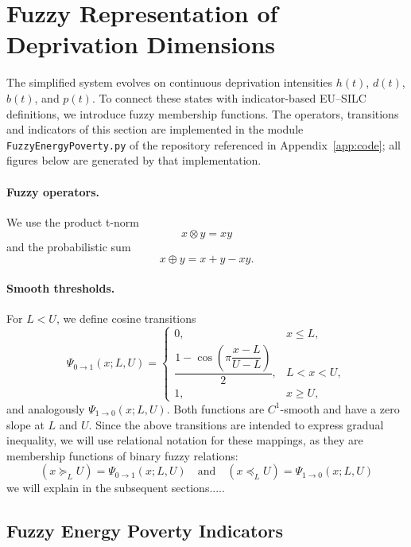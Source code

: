 \documentclass[11pt,a4paper]{article}
\begin{document}


\section{Fuzzy Representation of Deprivation Dimensions}\label{sec:fuzzy}

The simplified system evolves on continuous deprivation intensities
$h(t)$, $d(t)$, $b(t)$, and $p(t)$. To connect these states with indicator-based
EU--SILC definitions, we introduce fuzzy membership functions. The operators,
transitions and indicators of this section are implemented in the module
\texttt{FuzzyEnergyPoverty.py} of the repository referenced in
Appendix~\ref{app:code}; all figures below are generated by that
implementation.

\paragraph{Fuzzy operators.}
We use the product t-norm
\[
x\otimes y = xy
\]
and the probabilistic sum
\[
x\oplus y = x+y-xy.
\]

\paragraph{Smooth thresholds.}
For $L<U$, we define cosine transitions
\begin{equation}\label{eq:costransition}
\Psi_{0\to1}(x;L,U)=
\begin{cases}
0,&x\le L,\\
\dfrac{1-\cos\!\left(\pi\dfrac{x-L}{U-L}\right)}{2},&L<x<U,\\
1,&x\ge U,
\end{cases}
\end{equation}
and analogously $\Psi_{1\to0}(x;L,U)$. Both functions are $C^1$-smooth and have a zero slope at $L$ and $U$.  Since the above transitions are intended to express gradual inequality, we will use relational notation for these mappings, as they are membership functions of binary fuzzy relations:
\begin{equation}\label{def:fuzzyineq}
(x\succeq_LU)=\Psi_{0\to1}(x;L,U)
\quad\text{and}\quad (x\preceq_LU)=\Psi_{1\to0}(x;L,U)
\end{equation}
we will explain in the subsequent sections.....

\subsection{Fuzzy Energy Poverty Indicators}
\end{document}
